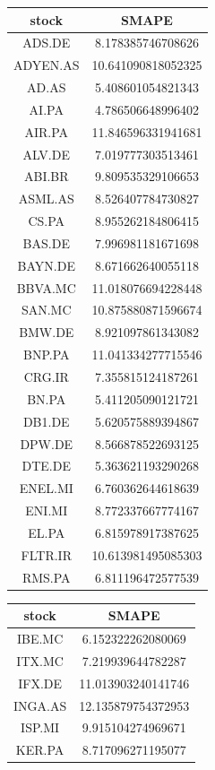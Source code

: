 \documentclass[11pt]{article} %
\begin{document}
\begin{table}[H]
\begin{tabular}{| c | c | }
\hline
stock    & SMAPE\\
\hline
ADS.DE   & 8.178385746708626\\
ADYEN.AS & 10.641090818052325\\
AD.AS    & 5.408601054821343\\
AI.PA    & 4.786506648996402\\
AIR.PA   & 11.846596331941681\\
ALV.DE   & 7.019777303513461\\
ABI.BR   & 9.809535329106653\\
ASML.AS  & 8.526407784730827\\
CS.PA    & 8.955262184806415\\
BAS.DE   & 7.996981181671698\\
BAYN.DE  & 8.671662640055118\\
BBVA.MC  & 11.018076694228448\\
SAN.MC   & 10.875880871596674\\
BMW.DE   & 8.921097861343082\\
BNP.PA   & 11.041334277715546\\
CRG.IR   & 7.355815124187261\\
BN.PA    & 5.411205090121721\\
DB1.DE   & 5.620575889394867\\
DPW.DE   & 8.566878522693125\\
DTE.DE   & 5.363621193290268\\
ENEL.MI  & 6.760362644618639\\
ENI.MI   & 8.772337667774167\\
EL.PA    & 6.815978917387625\\
FLTR.IR  & 10.613981495085303\\
RMS.PA   & 6.811196472577539\\
\hline
\end{tabular}
\begin{tabular}{ | c | c |}
\hline
stock    & SMAPE\\
\hline
IBE.MC   & 6.152322262080069\\
ITX.MC   & 7.219939644782287\\
IFX.DE   & 11.013903240141746\\
INGA.AS  & 12.135879754372953\\
ISP.MI   & 9.915104274969671\\
KER.PA   & 8.717096271195077\\

\end{tabular}
\end{table}
\end{document}

